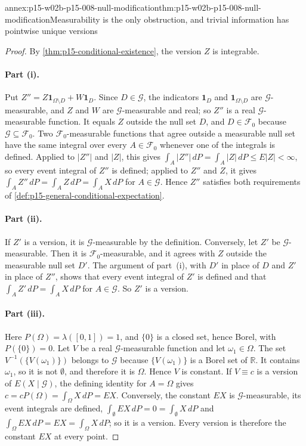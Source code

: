 \begin{annexitem}{annex:p15-w02b-p15-008-null-modification}{thm:p15-w02b-p15-008-null-modification}{Measurability is the only obstruction, and trivial information has pointwise unique versions}
\begin{proof}
By \cref{thm:p15-conditional-existence}, the version \(Z\) is integrable.

\paragraph{Part (i).}
Put \(Z''=Z\mathbf1_{\Omega\setminus D}+W\mathbf1_D\). Since
\(D\in\mathcal G\), the indicators \(\mathbf1_D\) and
\(\mathbf1_{\Omega\setminus D}\) are \(\mathcal G\)-measurable, and \(Z\)
and \(W\) are \(\mathcal G\)-measurable and real; so \(Z''\) is a real
\(\mathcal G\)-measurable function. It equals \(Z\) outside the null set
\(D\), and \(D\in\mathcal F_0\) because \(\mathcal G\subseteq\mathcal F_0\).
Two \(\mathcal F_0\)-measurable functions that agree outside a measurable
null set have the same integral over every \(A\in\mathcal F_0\) whenever
one of the integrals is defined. Applied to \(|Z''|\) and \(|Z|\), this
gives \(\int_A|Z''|\,dP=\int_A|Z|\,dP\leq E|Z|<\infty\), so every event
integral of \(Z''\) is defined; applied to \(Z''\) and \(Z\), it gives
\(\int_AZ''\,dP=\int_AZ\,dP=\int_AX\,dP\) for \(A\in\mathcal G\). Hence
\(Z''\) satisfies both requirements of
\cref{def:p15-general-conditional-expectation}.

\paragraph{Part (ii).}
If \(Z'\) is a version, it is \(\mathcal G\)-measurable by the definition.
Conversely, let \(Z'\) be \(\mathcal G\)-measurable. Then it is
\(\mathcal F_0\)-measurable, and it agrees with \(Z\) outside the
measurable null set \(D'\). The argument of part~(i), with \(D'\) in place
of \(D\) and \(Z'\) in place of \(Z''\), shows that every event integral of
\(Z'\) is defined and that \(\int_AZ'\,dP=\int_AX\,dP\) for
\(A\in\mathcal G\). So \(Z'\) is a version.

\paragraph{Part (iii).}
Here \(P(\Omega)=\lambda([0,1])=1\), and \(\{0\}\) is a closed set, hence
Borel, with \(P(\{0\})=0\).
Let \(V\) be a real \(\mathcal G\)-measurable function and let
\(\omega_1\in\Omega\). The set \(V^{-1}(\{V(\omega_1)\})\) belongs to
\(\mathcal G\) because \(\{V(\omega_1)\}\) is a Borel set of
\(\mathbb R\). It contains \(\omega_1\), so it is not \(\emptyset\), and
therefore it is \(\Omega\). Hence \(V\) is constant. If \(V\equiv c\) is a
version of \(E(X\mid\mathcal G)\), the defining identity for
\(A=\Omega\) gives \(c=cP(\Omega)=\int_\Omega X\,dP=EX\). Conversely, the
constant \(EX\) is \(\mathcal G\)-measurable, its event integrals are
defined, \(\int_\emptyset EX\,dP=0=\int_\emptyset X\,dP\) and
\(\int_\Omega EX\,dP=EX=\int_\Omega X\,dP\); so it is a version. Every
version is therefore the constant \(EX\) at every point.


\end{proof}
\end{annexitem}
